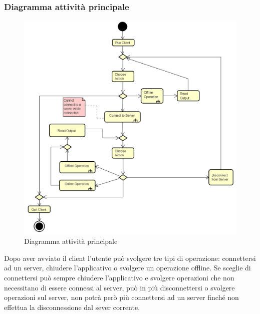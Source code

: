 \documentclass[a4paper]{article}
\begin{document}
		\subsubsection{Diagramma attività principale}
		
		\begin{figure} [H]
			\centering
			\includegraphics[scale=0.6]{ST/client/diagramma-attivita-generale.png}
			\caption{Diagramma attività principale}
		\end{figure}
			Dopo aver avviato il client l'utente può svolgere tre tipi di operazione: connettersi ad un server, chiudere l'applicativo o svolgere un operazione offline. Se sceglie di connettersi può sempre chiudere l'applicativo e svolgere operazioni che non necessitano di essere connessi al server, può in più disconnettersi o svolgere operazioni sul server, non potrà però più connettersi ad un server finché non effettua la disconnessione dal sever corrente.
			
\end{document}
